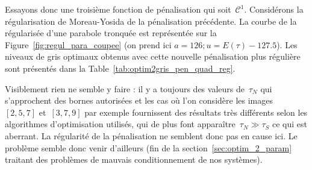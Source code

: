 \documentclass[main.tex]{subfiles}
\begin{document}
Essayons donc une troisième fonction de pénalisation qui soit~$\mathcal{C}^1$. Considérons la régularisation de Moreau-Yosida de la pénalisation précédente. La courbe de la régularisée d'une parabole tronquée est représentée sur la Figure~\ref{fig:regul_para_coupee} (on prend ici $a=126; u=E(\tau)-127.5$). Les niveaux de gris optimaux obtenus avec cette nouvelle pénalisation plus régulière sont présentés dans la Table~\ref{tab:optim2gris_pen_quad_reg}.


Visiblement rien ne semble y faire : il y a toujours des valeurs de~$\tau_N$ qui s'approchent des bornes autorisées et les cas où l'on considère les images~$[2,5,7]$ et~$[3,7,9]$ par exemple  fournissent des résultats très différents selon les algorithmes d'optimisation utilisés, qui de plus font apparaître~$\tau_N{\gg}\tau_S$ ce qui est aberrant.
La régularité de la pénalisation ne semblent donc pas en cause ici. Le problème semble donc venir d'ailleurs (\cf fin de la section~\ref{sec:optim_2_param} traitant des problèmes de mauvais  conditionnement de nos systèmes).

\end{document}
